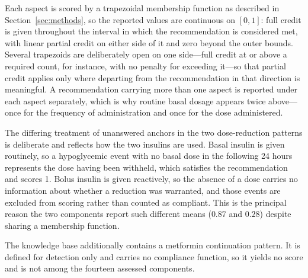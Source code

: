 Each aspect is scored by a trapezoidal membership function as described in
Section~\ref{sec:methods}, so the reported values are continuous on $[0,1]$:
full credit is given throughout the interval in which the recommendation is
considered met, with linear partial credit on either side of it and zero
beyond the outer bounds. Several trapezoids are deliberately open on one
side---full credit at or above a required count, for instance, with no
penalty for exceeding it---so that partial credit applies only where
departing from the recommendation in that direction is meaningful. A
recommendation carrying more than one aspect is reported under each aspect
separately, which is why routine basal dosage appears twice above---once for
the frequency of administration and once for the dose administered.

The differing treatment of unanswered anchors in the two dose-reduction
patterns is deliberate and reflects how the two insulins are used. Basal
insulin is given routinely, so a hypoglycemic event with no basal dose in
the following 24 hours represents the dose having been withheld, which
satisfies the recommendation and scores 1. Bolus insulin is given
reactively, so the absence of a dose carries no information about whether a
reduction was warranted, and those events are excluded from scoring rather
than counted as compliant. This is the principal reason the two components
report such different means ($0.87$ and $0.28$) despite sharing a membership
function.

The knowledge base additionally contains a metformin continuation pattern.
It is defined for detection only and carries no compliance function, so it
yields no score and is not among the fourteen assessed components.
